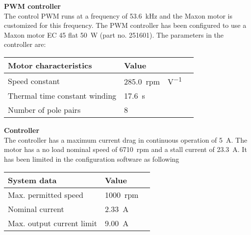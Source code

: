 \textbf{PWM controller}\\
The control PWM runs at a frequency of \SI{53,6}{kHz} and the Maxon motor is customized for this frequency.
The PWM controller has been configured to use a Maxon motor EC 45 flat \SI{50}{W} (part no. 251601). The parameters in the controller are:
\begin{table}[H]
	\centering
	\begin{tabular}{|l|l|p{4.3cm}|}
		\hline%
		\textbf{Motor characteristics}       &  \textbf{Value}         \\
		\hline%
		Speed constant                                & \SI{285,0}{rpm\cdot V^{-1}}           \\
		\hline%
		Thermal time constant winding							  & \SI{17,6}{s}              \\
		\hline%
		Number of pole pairs							  & 8              \\
		\hline%
	\end{tabular}
\end{table}

\textbf{Controller}\\
The controller has a maximum current drag in continuous operation of \SI{5}{A}. The motor has a no load nominal speed of \SI{6710}{rpm} and a stall current of \SI{23,3}{A}. It has been limited in the configuration software as following
\begin{table}[H]
	\centering
	\begin{tabular}{|l|l|p{4.3cm}|}
		\hline%
		\textbf{System data}       &  \textbf{Value}         \\
		\hline%
		Max. permitted speed                                & \SI{1000}{rpm}           \\
		\hline%
		Nominal current							  & \SI{2,33}{A}              \\
		\hline%
		Max. output current limit							  & \SI{9,00}{A}              \\
		\hline%
	\end{tabular}
\end{table}

